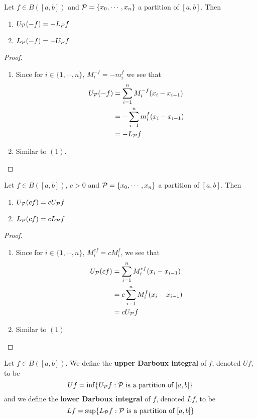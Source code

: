 \documentclass{book}
\begin{document}
	\begin{ex}  
		Let $f \in B([a,b])$ and $\mathcal{P} = \{x_0, \cdots, x_n\}$ a partition of $[a,b]$. Then 
		\begin{enumerate}
			\item $U_{\mathcal{P}} (-f) = -L_P f$
			\item $L_{\mathcal{P}} (-f) = - U_{\mathcal{P}} f$
		\end{enumerate}
	\end{ex}

	\begin{proof}\
		\begin{enumerate}
			\item Since for $i \in \{1, \cdots, n\}$, $M^{-f}_i = -m^f_i$ we see that 
			\begin{align*}
				U_{\mathcal{P}}(-f) 
				&= \sum_{i=1}^n M^{-f}_i(x_i - x_{i-1}) \\
				&= - \sum_{i=1}^n m^f_i(x_i - x_{i-1}) \\
				&= - L_{\mathcal{P}} f
			\end{align*}
			\item Similar to $(1)$.
		\end{enumerate}
	\end{proof}

	\begin{ex}  
		Let $f \in B([a,b])$, $c >0$ and $\mathcal{P} = \{x_0, \cdots, x_n\}$ a partition of $[a,b]$. Then 
		\begin{enumerate}
			\item $U_{\mathcal{P}} (cf) = c U_{\mathcal{P}} f$ 
			\item $L_{\mathcal{P}} (cf) = c L_{\mathcal{P}} f $
		\end{enumerate}
	\end{ex}

	\begin{proof}\
		\begin{enumerate}
			\item Since for $i \in \{1, \cdots, n\}$, $M^{cf}_i = cM^f_i$, we see that  
			\begin{align*}
				U_{\mathcal{P}} (cf) 
				&= \sum_{i=1}^n M^{cf}_i (x_i - x_{i-1}) \\
				&= c \sum_{i=1}^n M^f_i (x_i - x_{i-1}) \\
				&= c U_{\mathcal{P}} f
			\end{align*}
			\item Similar to $(1)$
		\end{enumerate}
	\end{proof}
	
	\begin{defn}  
		Let $f \in B([a,b])$. We define the \textbf{upper Darboux integral} of $f$, denoted $U f$, to be $$Uf = \inf \{U_{\mathcal{P}} f: \mathcal{P} \text{ is a partition of } [a,b]\}$$
		and we define the \textbf{lower Darboux integral} of $f$, denoted $L f$, to be $$Lf = \sup \{L_{\mathcal{P}} f: \mathcal{P} \text{ is a partition of } [a,b]\}$$ 
	\end{defn}
\end{document}
